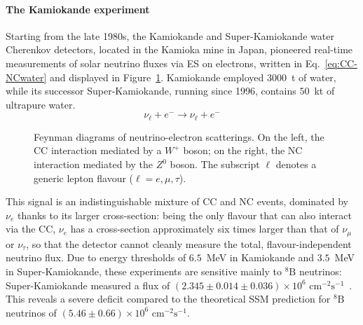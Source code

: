 \paragraph{The Kamiokande experiment}
Starting from the late 1980s, the Kamiokande and Super-Kamiokande water Cherenkov detectors, located in the Kamioka mine in Japan, pioneered real-time measurements of solar neutrino fluxes via \ac{ES} on electrons, written in Eq.~\ref{eq:CC-NCwater} and displayed in Figure~\ref{fig:feynman-CCandNCint}. Kamiokande employed $3000$~t of water, while its successor Super-Kamiokande, running since 1996, contains $50$~kt of ultrapure water.
\begin{equation}
    \label{eq:CC-NCwater}
    \nu_\ell + e^- \longrightarrow \nu_\ell + e^-
\end{equation}
\begin{figure}[H]
    \centering
    \resizebox{0.7\textwidth}{!}{
        
    }
    \caption{Feynman diagrams of neutrino-electron scatterings. On the left, the \ac{CC} interaction mediated by a $W^+$ boson; on the right, the \ac{NC} 
    interaction mediated by the $Z^0$ boson. The subscript $\ell$ denotes a generic lepton flavour ($\ell = e, \mu, \tau$).}
    \label{fig:feynman-CCandNCint}
\end{figure}
This signal is an indistinguishable mixture of \ac{CC} and \ac{NC} events, dominated by $\nu_e$ thanks to its larger cross-section: being the only flavour that can also interact via the \ac{CC}, $\nu_e$ has a cross-section approximately six times larger than that of $\nu_\mu$ or $\nu_\tau$, so that the detector cannot cleanly measure the total, flavour-independent neutrino flux. Due to energy thresholds of $6.5$~MeV in Kamiokande and $3.5$~MeV in Super-Kamiokande, these experiments are sensitive mainly to ${}^8\text{B}$ neutrinos: Super-Kamiokande measured a flux of $(2.345 \pm 0.014 \pm 0.036) \times 10^{6} \text{ cm}^{-2}\text{s}^{-1}$~\cite{latestSUPERK}. This reveals a severe deficit compared to the theoretical \ac{SSM} prediction for ${}^8\text{B}$ neutrinos of $(5.46 \pm 0.66) \times 10^{6} \text{ cm}^{-2}\text{s}^{-1}$.


